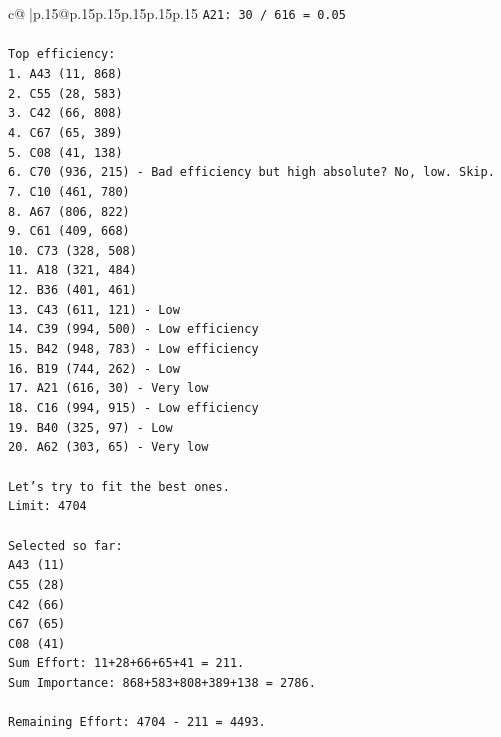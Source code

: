 \documentclass{article}
\begin{document}
{\begin{supertabular}{c@{$\;$}|p{.15\linewidth}@{}p{.15\linewidth}p{.15\linewidth}p{.15\linewidth}p{.15\linewidth}p{.15\linewidth}}
{{{\texttt{A21: 30 / 616 = 0.05} \\
\\ 
\texttt{Top efficiency:} \\
\texttt{1. A43 (11, 868)} \\
\texttt{2. C55 (28, 583)} \\
\texttt{3. C42 (66, 808)} \\
\texttt{4. C67 (65, 389)} \\
\texttt{5. C08 (41, 138)} \\
\texttt{6. C70 (936, 215) {-} Bad efficiency but high absolute? No, low. Skip.} \\
\texttt{7. C10 (461, 780)} \\
\texttt{8. A67 (806, 822)} \\
\texttt{9. C61 (409, 668)} \\
\texttt{10. C73 (328, 508)} \\
\texttt{11. A18 (321, 484)} \\
\texttt{12. B36 (401, 461)} \\
\texttt{13. C43 (611, 121) {-} Low} \\
\texttt{14. C39 (994, 500) {-} Low efficiency} \\
\texttt{15. B42 (948, 783) {-} Low efficiency} \\
\texttt{16. B19 (744, 262) {-} Low} \\
\texttt{17. A21 (616, 30) {-} Very low} \\
\texttt{18. C16 (994, 915) {-} Low efficiency} \\
\texttt{19. B40 (325, 97) {-} Low} \\
\texttt{20. A62 (303, 65) {-} Very low} \\
\\ 
\texttt{Let's try to fit the best ones.} \\
\texttt{Limit: 4704} \\
\\ 
\texttt{Selected so far:} \\
\texttt{A43 (11)} \\
\texttt{C55 (28)} \\
\texttt{C42 (66)} \\
\texttt{C67 (65)} \\
\texttt{C08 (41)} \\
\texttt{Sum Effort: 11+28+66+65+41 = 211.} \\
\texttt{Sum Importance: 868+583+808+389+138 = 2786.} \\
\\ 
\texttt{Remaining Effort: 4704 {-} 211 = 4493.} \\
}}}
\end{supertabular}}
\end{document}
